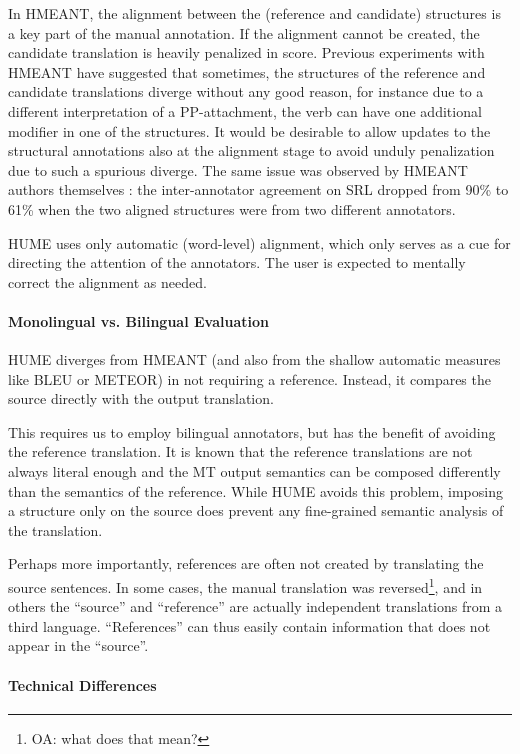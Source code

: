 \documentclass[11pt]{article}
\newcommand{\oa}[1]{\footnote{\color{red}OA: #1}}
\def\parcite#1{\cite{#1}}
\begin{document}
In HMEANT, the alignment between the (reference and candidate) structures is a key
part of the manual annotation. If the alignment cannot be created, the candidate
translation is heavily penalized in score.
Previous experiments with HMEANT
\parcite{bojar:wu:ssst:2012,chuchunkov-tarelkin-galinskaya:2014:SSST-8} have
suggested that sometimes, the structures of the reference and candidate
translations diverge without any good reason, for instance due to a different
interpretation of a PP-attachment, the verb can have one additional modifier in
one of the structures. It would be desirable to allow updates to the structural
annotations also at the alignment stage
to avoid unduly penalization due to such a spurious diverge.
The same issue was observed by HMEANT authors themselves
\parcite{lo:wu:reliability:2014}:
the 
inter-annotator agreement on SRL dropped from 90\% to 61\% 
when the two aligned structures were from two different annotators.

HUME uses only automatic (word-level) alignment, which only serves as a cue for directing
the attention of the annotators.
The user is expected to mentally correct the alignment as needed.


\paragraph{Monolingual vs. Bilingual Evaluation}
HUME diverges from HMEANT (and also from the shallow automatic measures
like BLEU or METEOR) in not requiring a reference.
Instead, it compares the source directly with the output translation.

This requires us to employ bilingual annotators, but has the benefit of avoiding
the reference translation. It is known that the reference translations are not
always literal enough and the MT output semantics can be composed differently
than the semantics of the reference. While HUME avoids this problem,
imposing a structure only on the source does prevent any fine-grained semantic
analysis of the translation.

Perhaps more importantly, references are often not created by translating the source
sentences. In some cases, the manual translation was reversed\oa{what does that mean?},
and in others the ``source'' and ``reference'' are actually independent translations
from a third language. ``References'' can thus easily contain information
that does not appear in the ``source''.


\paragraph{Technical Differences}
\end{document}

